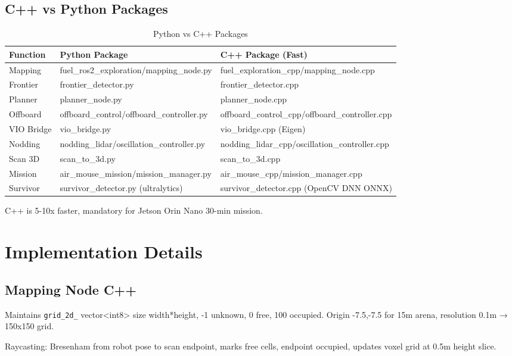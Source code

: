 \documentclass[12pt,a4paper]{article}
\begin{document}
\subsection{C++ vs Python Packages}

\begin{table}[H]
\centering
\begin{tabular}{@{}lll@{}}
\toprule
Function & Python Package & C++ Package (Fast) \\
\midrule
Mapping & fuel\_ros2\_exploration/mapping\_node.py & fuel\_exploration\_cpp/mapping\_node.cpp \\
Frontier & frontier\_detector.py & frontier\_detector.cpp \\
Planner & planner\_node.py & planner\_node.cpp \\
Offboard & offboard\_control/offboard\_controller.py & offboard\_control\_cpp/offboard\_controller.cpp \\
VIO Bridge & vio\_bridge.py & vio\_bridge.cpp (Eigen) \\
Nodding & nodding\_lidar/oscillation\_controller.py & nodding\_lidar\_cpp/oscillation\_controller.cpp \\
Scan 3D & scan\_to\_3d.py & scan\_to\_3d.cpp \\
Mission & air\_mouse\_mission/mission\_manager.py & air\_mouse\_cpp/mission\_manager.cpp \\
Survivor & survivor\_detector.py (ultralytics) & survivor\_detector.cpp (OpenCV DNN ONNX) \\
\bottomrule
\end{tabular}
\caption{Python vs C++ Packages}
\end{table}

C++ is 5-10x faster, mandatory for Jetson Orin Nano 30-min mission.

\section{Implementation Details}

\subsection{Mapping Node C++}

Maintains \texttt{grid\_2d\_} vector<int8> size width*height, -1 unknown, 0 free, 100 occupied. Origin -7.5,-7.5 for 15m arena, resolution 0.1m → 150x150 grid.

Raycasting: Bresenham from robot pose to scan endpoint, marks free cells, endpoint occupied, updates voxel grid at 0.5m height slice.
\end{document}
